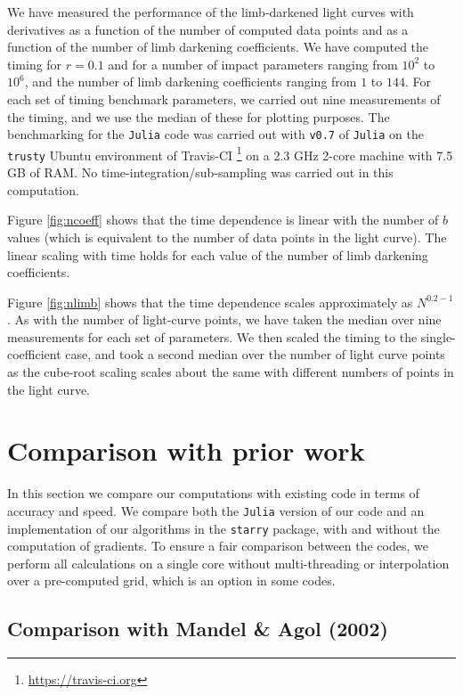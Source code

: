 \documentclass[modern,trackchanges]{aastex63}
\begin{document}
We have measured the performance of the limb-darkened light curves
with derivatives as a function of the number of computed data points
and as a function of the number of limb darkening coefficients.  We
have computed the timing for $r=0.1$ and for a number of impact
parameters ranging from $10^2$ to $10^6$, and the number of limb darkening
coefficients ranging from $1$ to $144$.  For each set of timing benchmark
parameters, we carried out nine measurements  of the timing, and
we use the median of these for plotting purposes.  The benchmarking
for the \texttt{Julia} code was carried out with \texttt{v0.7} of
\texttt{Julia} on the \texttt{trusty} Ubuntu environment of Travis-CI%
\footnote{\url{https://travis-ci.org}}
on a 2.3 GHz
2-core machine with 7.5 GB of RAM.
No time-integration/sub-sampling was carried out in this computation.

Figure \ref{fig:ncoeff} shows that the time dependence is linear with the
number of $b$ values (which is equivalent to the number of data points
in the light curve).  The linear scaling with time holds for each value of
the number of limb darkening coefficients.

Figure \ref{fig:nlimb} shows that the time dependence scales approximately
as $N^{0.2-1}$.  As with the number of light-curve points, we have taken
the median over nine measurements for each set of parameters.  We then
scaled the timing to the single-coefficient case, and took a second
median over the number of light curve points as the cube-root scaling scales
about the same with different numbers of points in the light curve.


\section{Comparison with prior work} \label{sec:comparison}

In this section we compare our computations with existing code in terms
of accuracy and speed. We compare both the \texttt{Julia} version
of our code and an implementation of our algorithms
in the \texttt{starry} package, with and without the computation
of gradients. To ensure a fair comparison between the codes, we
perform all calculations on a single core without multi-threading
or interpolation over a pre-computed grid, which is an option
in some codes.

\subsection{Comparison with Mandel \& Agol (2002)}
\end{document}
